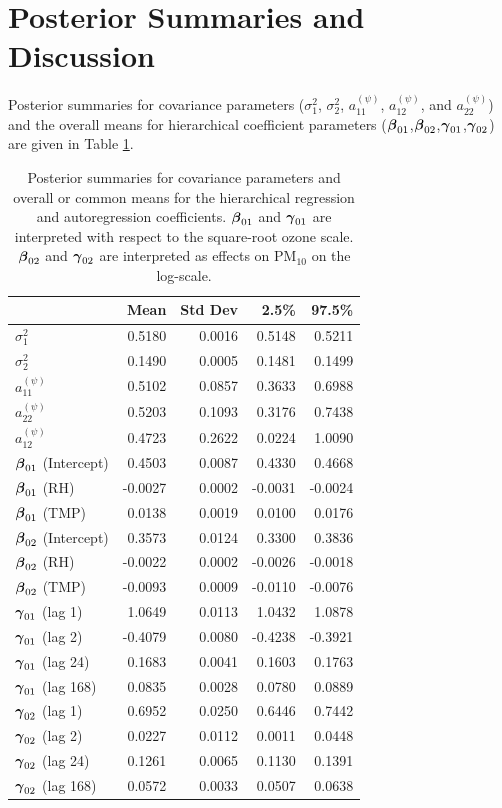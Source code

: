 \documentclass[alpha-refs]{wiley-article}
\newcommand{\bbeta}{ \mbox{\boldmath $ \beta $} }
\newcommand{\bgamma}{ \mbox{\boldmath $\gamma$} }
\begin{document}
\section{Posterior Summaries and Discussion}\label{sec:post_sum}

Posterior summaries for covariance parameters ($\sigma^2_1$, $\sigma^2_2$, $a^{(\psi)}_{11}$, $a^{(\psi)}_{12}$, and $a^{(\psi)}_{22}$) and the overall means for hierarchical coefficient parameters ($\bbeta_{01}$,$\bbeta_{02}$,$\bgamma_{01}$,$\bgamma_{02}$) are given in Table \ref{tab:post_sum}.

\vspace{-2mm}
\begin{table}[H]
\centering
\footnotesize
\begin{tabular}{lrrrr}
  \hline
 & Mean & Std Dev & 2.5\% & 97.5\% \\
  \hline
\rule{0pt}{2.2ex}$\sigma^2_1$ & 0.5180 & 0.0016 & 0.5148 & 0.5211 \\
$\sigma^2_2$ & 0.1490 & 0.0005 & 0.1481 & 0.1499 \\
$a_{11}^{(\psi)}$ & 0.5102 & 0.0857 & 0.3633 & 0.6988 \\
$a_{22}^{(\psi)}$ & 0.5203 & 0.1093 & 0.3176 & 0.7438 \\
$a_{12}^{(\psi)}$ & 0.4723 & 0.2622 & 0.0224 & 1.0090 \\
$\bbeta_{01}$ (Intercept) & 0.4503 & 0.0087 & 0.4330 & 0.4668 \\
$\bbeta_{01}$ (RH)  & -0.0027 & 0.0002 & -0.0031 & -0.0024 \\
$\bbeta_{01}$ (TMP)  & 0.0138 & 0.0019 & 0.0100 & 0.0176 \\
$\bbeta_{02}$ (Intercept) & 0.3573 & 0.0124 & 0.3300 & 0.3836 \\
$\bbeta_{02}$ (RH) & -0.0022 & 0.0002 & -0.0026 & -0.0018 \\
$\bbeta_{02}$ (TMP)  & -0.0093 & 0.0009 & -0.0110 & -0.0076 \\
$\bgamma_{01}$ (lag 1) & 1.0649 & 0.0113 & 1.0432 & 1.0878 \\
$\bgamma_{01}$ (lag 2) & -0.4079 & 0.0080 & -0.4238 & -0.3921 \\
$\bgamma_{01}$ (lag 24)  & 0.1683 & 0.0041 & 0.1603 & 0.1763 \\
$\bgamma_{01}$ (lag 168) & 0.0835 & 0.0028 & 0.0780 & 0.0889 \\
$\bgamma_{02}$ (lag 1) & 0.6952 & 0.0250 & 0.6446 & 0.7442 \\
$\bgamma_{02}$ (lag 2) & 0.0227 & 0.0112 & 0.0011 & 0.0448 \\
$\bgamma_{02}$ (lag 24)& 0.1261 & 0.0065 & 0.1130 & 0.1391 \\
$\bgamma_{02}$ (lag 168) & 0.0572 & 0.0033 & 0.0507 & 0.0638 \\
   \hline
\end{tabular}
\caption{Posterior summaries for covariance parameters and overall or common means for the hierarchical regression and autoregression coefficients. $\bbeta_{01}$ and $\bgamma_{01}$ are interpreted with respect to the square-root ozone scale. $\bbeta_{02}$ and $\bgamma_{02}$ are interpreted as effects on $\text{PM}_{10}$ on the log-scale.}\label{tab:post_sum}
\end{table}
\end{document}

